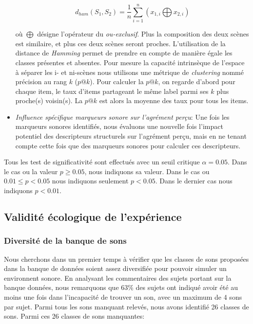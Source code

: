 \begin{itemize}
\begin{equation*}
d_{ham}(S_1,S_2)=\dfrac{1}{n}\sum_{i=1}^{n} (x_{1,i} \bigoplus x_{2,i})
\end{equation*}

où $\bigoplus$ désigne l'opérateur du \emph{ou-exclusif}. Plus la composition des deux scènes est similaire, et plus ces deux scènes seront proches. L'utilisation de la distance de \emph{Hamming} permet de prendre en compte de manière égale les classes présentes et absentes. Pour mesure la capacité intrinsèque de l'espace à séparer les i- et ni-scènes nous utilisons une métrique de \emph{clustering} nommé précision au rang $k$ ($p@k$). Pour calculer la $p@k$, on regarde d'abord pour chaque item, le taux d'items partageant le même label parmi ses $k$ plus proche(s) voisin(s). La $p@k$ est alors la moyenne des taux pour tous les items.

\item \emph{Influence spécifique marqueurs sonore sur l'agrément perçu}: Une fois les marqueurs sonores identifiés, nous évaluons une nouvelle fois l'impact potentiel des descripteurs structurels sur l'agrément perçu, mais en ne tenant compte cette fois que des marqueurs sonores pour calculer ces descripteurs.
\end{itemize}

Tous les test de significativité sont effectués avec un seuil critique $\alpha=0.05$. Dans le cas ou la valeur $p\geq0.05$, nous indiquons sa valeur. Dans le cas ou $0.01\leq p<0.05$ nous indiquons seulement $p<0.05$. Dans le dernier cas nous indiquons $p<0.01$.

\subsection{Validité écologique de l'expérience}

\subsubsection{Diversité de la banque de sons}

Nous cherchons dans un premier temps à vérifier que les classes de sons proposées dans la banque de données soient assez diversifiée pour pouvoir simuler un environnent sonore. En analysant les commentaires des sujets portant sur la banque données, nous remarquons que 63\% des sujets ont indiqué avoir été au moins une fois dans l'incapacité de trouver un son, avec un maximum de 4 sons par sujet. Parmi tous les sons manquant relevés, nous avons identifié 26 classes de sons. Parmi ces 26 classes de sons manquantes:


